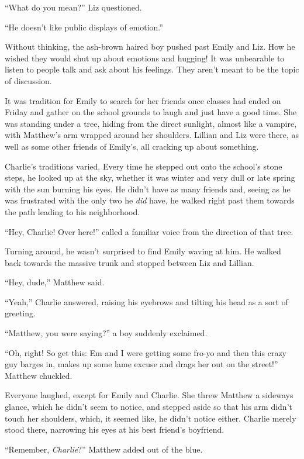 “What do you mean?” Liz questioned.

“He doesn't like public displays of emotion.”

Without thinking, the ash-brown haired boy pushed past Emily and Liz. How he wished they would shut up about emotions and hugging! It was unbearable to listen to people talk and ask about his feelings. They aren't meant to be the topic of discussion.

\bigskip

It was tradition for Emily to search for her friends once classes had ended on Friday and gather on the school grounds to laugh and just have a good time. She was standing under a tree, hiding from the direct sunlight, almost like a vampire, with Matthew's arm wrapped around her shoulders. Lillian and Liz were there, as well as some other friends of Emily's, all cracking up about something.

Charlie's traditions varied. Every time he stepped out onto the school's stone steps, he looked up at the sky, whether it was winter and very dull or late spring with the sun burning his eyes. He didn't have as many friends and, seeing as he was frustrated with the only two he \textit{did} have, he walked right past them towards the path leading to his neighborhood.

“Hey, Charlie! Over here!” called a familiar voice from the direction of that tree.

Turning around, he wasn't surprised to find Emily waving at him. He walked back towards the massive trunk and stopped between Liz and Lillian.

“Hey, dude,” Matthew said.

“Yeah,” Charlie answered, raising his eyebrows and tilting his head as a sort of greeting.

“Matthew, you were saying?” a boy suddenly exclaimed.

“Oh, right! So get this: Em and I were getting some fro-yo and then this crazy guy barges in, makes up some lame excuse and drags her out on the street!” Matthew chuckled.

Everyone laughed, except for Emily and Charlie. She threw Matthew a sideways glance, which he didn't seem to notice, and stepped aside so that his arm didn't touch her shoulders, which, it seemed like, he didn't notice either. Charlie merely stood there, narrowing his eyes at his best friend's boyfriend.

“Remember, \textit{Charlie}?” Matthew added out of the blue.

